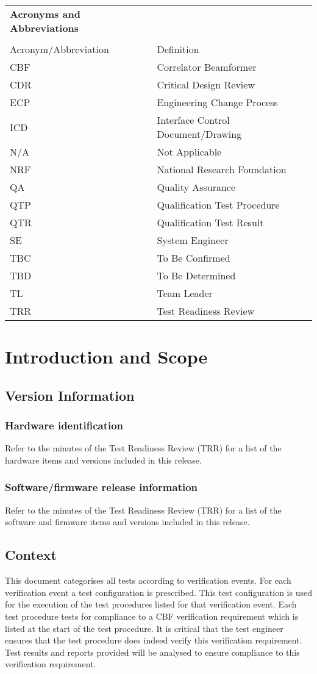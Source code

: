 \begin{longtable}{ll}
	{\bf\LARGE Acronyms and Abbreviations} & \\\\
	Acronym/Abbreviation & Definition \\
	CBF & Correlator Beamformer \\
	CDR & Critical Design Review \\
	ECP & Engineering Change Process \\
	ICD & Interface Control Document/Drawing \\
	N/A & Not Applicable \\
	NRF & National Research Foundation \\
	QA  & Quality Assurance \\
	QTP & Qualification Test Procedure \\
	QTR & Qualification Test Result \\
	SE  & System Engineer \\
	TBC & To Be Confirmed \\
	TBD & To Be Determined \\
	TL  & Team Leader \\
	TRR & Test Readiness Review \\
\end{longtable}

\chapter{Introduction and Scope}
\section{Version Information}
\subsection{Hardware identification}
Refer to the minutes of the Test Readiness Review (TRR) for a list of the hardware items and versions included in this release.
\subsection{Software/firmware release information}
Refer to the minutes of the Test Readiness Review (TRR) for a list of the software and firmware items and versions included in this release.
\section{Context}
This document categorises all tests according to verification events. For each verification event a test configuration is prescribed. This test configuration is used for the execution of the test procedures listed for that verification event. Each test procedure tests for compliance to a CBF verification requirement which is listed at the start of the test procedure. It is critical that the test engineer ensures that the test procedure does indeed verify this verification requirement. Test results and reports provided will be analysed to ensure compliance to this verification requirement.
